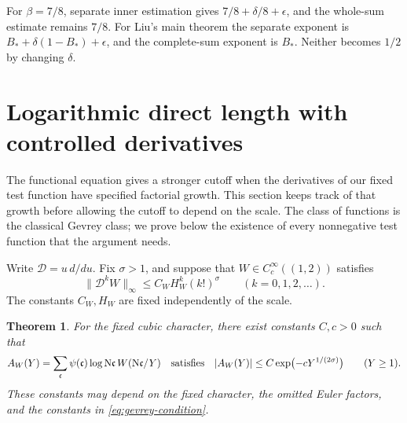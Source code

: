 \documentclass[11pt]{article}
\newtheorem{theorem}{Theorem}[section]
\newcommand{\N}{\mathrm N}
\begin{document}
For $\beta=7/8$, separate inner estimation gives
$7/8+\delta/8+\epsilon$, and the whole-sum estimate remains $7/8$.
For Liu's main theorem the separate exponent is
$B_*+\delta(1-B_*)+\epsilon$, and the complete-sum exponent is
$B_*$. Neither becomes $1/2$ by changing $\delta$.

\section{Logarithmic direct length with controlled derivatives}
\label{sec:gevrey}
The functional equation gives a stronger cutoff when the derivatives of
our fixed test function have specified factorial growth. This section
keeps track of that growth before allowing the cutoff to depend on the
scale. The class of functions is the classical Gevrey class; we prove
below the existence of every nonnegative test function that the argument
needs.

Write $\mathcal D=u\,d/du$. Fix $\sigma>1$, and suppose that
$W\in C_c^\infty((1,2))$ satisfies
\begin{equation}\label{eq:gevrey-condition}
 \|\mathcal D^k W\|_\infty\le C_W H_W^k(k!)^\sigma
 \qquad(k=0,1,2,\ldots).
\end{equation}
The constants $C_W,H_W$ are fixed independently of the scale.

\begin{theorem}\label{thm:gevrey-decay}
For the fixed cubic character, there exist constants $C,c>0$ such that
\begin{equation}\label{eq:gevrey-decay}
 A_W(Y)=\sum_{\mathfrak c}\psi(\mathfrak c)\log\N\mathfrak c\,
 W(\N\mathfrak c/Y)
 \quad\hbox{satisfies}\quad
 |A_W(Y)|\le C\exp\bigl(-cY^{1/(2\sigma)}\bigr)
 \qquad(Y\ge1).
\end{equation}
These constants may depend on the fixed character, the omitted Euler
factors, and the constants in \eqref{eq:gevrey-condition}.
\end{theorem}
\end{document}
